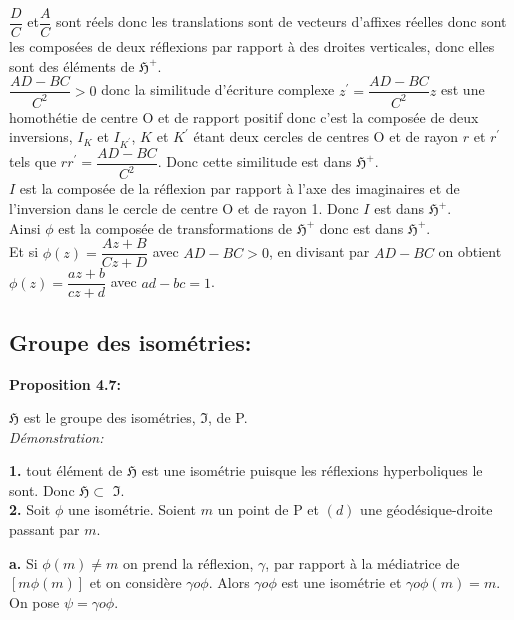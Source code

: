 \documentclass[a4paper, 12pt, twoside]{book}
\begin{document}
  $\dfrac{D}{C}$ et$\dfrac{A}{C}$ sont réels donc les translations sont de vecteurs d'affixes réelles donc sont les composées de deux réflexions par rapport à des droites verticales, donc elles sont des éléments de \textbf{$\mathfrak{H}^{+}$}.\\
  
  
 $\dfrac{AD-BC}{C^{2}}>0$ donc la similitude d'écriture complexe $z^{'}=\dfrac{AD-BC}{C^{2}}z$ est une homothétie de centre O et de rapport positif donc c'est la composée de deux inversions, $I_{K}$ et $I_{K^{'}}$, $K$ et $K^{'}$ étant deux cercles de centres O et de rayon $r$ et $r^{'}$ tels que $rr^{'}=\dfrac{AD-BC}{C^{2}}$. Donc cette similitude est dans \textbf{$\mathfrak{H}^{+}$}.\\ 
  
  
  $I$ est la composée de la réflexion par rapport à l'axe des imaginaires et de l'inversion dans le cercle de centre O et de rayon 1. Donc $I$  est dans \textbf{$\mathfrak{H}^{+}$}.\\ 
  
   
 Ainsi $\phi$ est la composée de transformations de \textbf{$\mathfrak{H}^{+}$} donc est dans \textbf{$\mathfrak{H}^{+}$}.\\
 
  Et si $\phi(z)=\dfrac{Az+B}{Cz+D}$ avec $AD-BC>0$, en divisant par $AD-BC$ on obtient $\phi(z)=\dfrac{az+b}{cz+d}$ avec $ad-bc=1$. 
 
\subsection{Groupe des isométries:}

\textbf{Proposition 4.7:}\

\textbf{$\mathfrak{H}$} est le groupe des isométries, \textbf{$\mathfrak{I}$},  de P.\\

\textit{Démonstration:}\

\textbf{1.} tout élément de \textbf{$\mathfrak{H}$} est une isométrie puisque les réflexions hyperboliques le sont. Donc  \textbf{$\mathfrak{H}$}$\subset$  \textbf{$\mathfrak{I}$}.\\

\textbf{2.} Soit $\phi$ une isométrie. Soient $m$ un point de P et $(d)$ une géodésique-droite passant par $m$.\

\textbf{a.} Si $\phi(m)\neq m$ on prend la réflexion, $\gamma$, par rapport à la médiatrice de $[m\phi(m)]$ et on considère $\gamma o\phi$. Alors   $\gamma o\phi$ est une isométrie et  $\gamma o\phi(m)=m$. On pose $\psi= \gamma o\phi$.\
\end{document}
